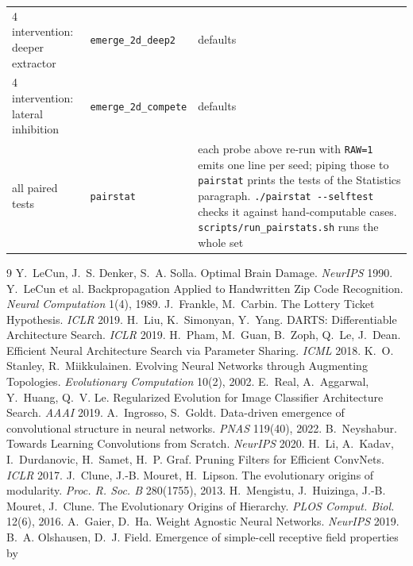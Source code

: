 \documentclass[11pt]{article}
\begin{document}
\begin{table}[ht]
\begin{tabular}{@{}llp{}@{}}
4 intervention: deeper extractor    & \texttt{emerge\_2d\_deep2} & defaults \\
4 intervention: lateral inhibition  & \texttt{emerge\_2d\_compete} & defaults \\
\midrule
all paired tests                    & \texttt{pairstat}         & each probe above re-run with
\texttt{RAW=1} emits one line per seed; piping those to \texttt{pairstat} prints the tests of the
Statistics paragraph. \texttt{./pairstat -{}-selftest} checks it against hand-computable cases.
\texttt{scripts/run\_pairstats.sh} runs the whole set \\
\bottomrule
\end{tabular}
\end{table}

\begin{thebibliography}{9}\setlength{\itemsep}{0pt}\setlength{\parskip}{0pt}
 Y.~LeCun, J.~S. Denker, S.~A. Solla. Optimal Brain Damage. \emph{NeurIPS} 1990.
 Y.~LeCun et al. Backpropagation Applied to Handwritten Zip Code Recognition.
 \emph{Neural Computation} 1(4), 1989.
 J.~Frankle, M.~Carbin. The Lottery Ticket Hypothesis. \emph{ICLR} 2019.
 H.~Liu, K.~Simonyan, Y.~Yang. DARTS: Differentiable Architecture Search. \emph{ICLR} 2019.
 H.~Pham, M.~Guan, B.~Zoph, Q.~Le, J.~Dean. Efficient Neural Architecture Search via
 Parameter Sharing. \emph{ICML} 2018.
 K.~O. Stanley, R.~Miikkulainen. Evolving Neural Networks through Augmenting Topologies.
 \emph{Evolutionary Computation} 10(2), 2002.
 E.~Real, A.~Aggarwal, Y.~Huang, Q.~V. Le. Regularized Evolution for Image Classifier
 Architecture Search. \emph{AAAI} 2019.
 A.~Ingrosso, S.~Goldt. Data-driven emergence of convolutional structure in neural
 networks. \emph{PNAS} 119(40), 2022.
 B.~Neyshabur. Towards Learning Convolutions from Scratch. \emph{NeurIPS} 2020.
 H.~Li, A.~Kadav, I.~Durdanovic, H.~Samet, H.~P. Graf. Pruning Filters for Efficient
 ConvNets. \emph{ICLR} 2017.
 J.~Clune, J.-B. Mouret, H.~Lipson. The evolutionary origins of modularity.
 \emph{Proc. R. Soc. B} 280(1755), 2013.
 H.~Mengistu, J.~Huizinga, J.-B. Mouret, J.~Clune. The Evolutionary Origins of Hierarchy.
 \emph{PLOS Comput. Biol.} 12(6), 2016.
 A.~Gaier, D.~Ha. Weight Agnostic Neural Networks. \emph{NeurIPS} 2019.
 B.~A. Olshausen, D.~J. Field. Emergence of simple-cell receptive field properties by

\end{thebibliography}
\end{document}
